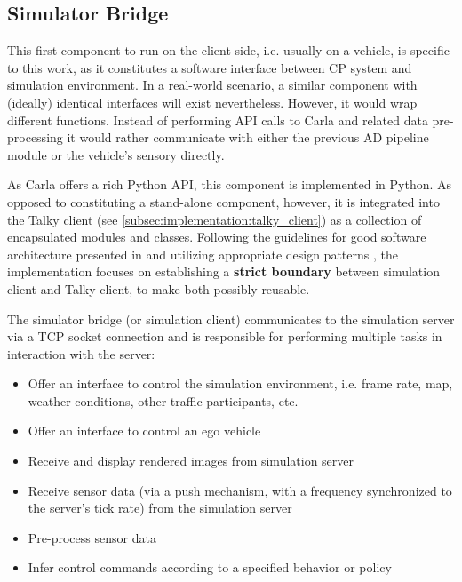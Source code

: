 \subsection{Simulator Bridge}
\label{subsec:implementation:simulator_bridge}
This first component to run on the client-side, i.e. usually on a vehicle, is specific to this work, as it constitutes a software interface between CP system and simulation environment. In a real-world scenario, a similar component with (ideally) identical interfaces will exist nevertheless. However, it would wrap different functions. Instead of performing API calls to Carla and related data pre-processing it would rather communicate with either the previous AD pipeline module or the vehicle's sensory directly. 

As Carla offers a rich Python API, this component is implemented in Python. As opposed to constituting a stand-alone component, however, it is integrated into the Talky client (see \cref{subsec:implementation:talky_client}) as a collection of encapsulated modules and classes. Following the guidelines for good software architecture presented in \cite{Martin2017} and utilizing appropriate design patterns \cite{EricFreemanElisabethFreemanBertBates2013}, the implementation focuses on establishing a \textbf{strict boundary} between simulation client and Talky client, to make both possibly reusable.

The simulator bridge (or simulation client) communicates to the simulation server via a TCP socket connection and is responsible for performing multiple tasks in interaction with the server:

\begin{itemize}
	\item Offer an interface to control the simulation environment, i.e. frame rate, map, weather conditions, other traffic participants, etc.
	\item Offer an interface to control an ego vehicle
	\item Receive and display rendered images from simulation server
	\item Receive sensor data (via a push mechanism, with a frequency synchronized to the server's tick rate) from the simulation server
	\item Pre-process sensor data
	\item Infer control commands according to a specified behavior or policy
\end{itemize}

